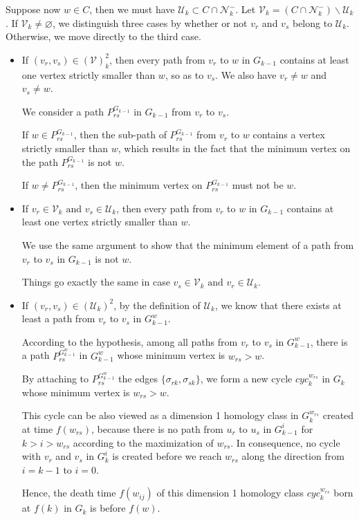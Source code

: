 \documentclass[a4paper,12pt]{article}
\numberwithin{equation}{section}
\begin{document}
	Suppose now $w \in C$, then we must have $\mathcal{U}_k \subset C \cap \mathcal{N}_k^-$. Let $\mathcal{V}_k = (C \cap \mathcal{N}_k^-) \backslash \mathcal{U}_k$. If $\mathcal{V}_k \neq \varnothing$, we distinguish three cases by whether or not $v_r$ and $v_s$ belong to $\mathcal{U}_k$. Otherwise, we move directly to the third case.
	    \begin{itemize}
	    	\item If $(v_r,v_s) \in (\mathcal{V})^2_k$, then every path from $v_r$ to $w$ in $G_{k-1}$ contains at least one vertex strictly smaller than $w$, so as to $v_s$. We also have $v_r \neq w$ and $v_s \neq w$.
	    	
	    	We consider a path $P_{rs}^{G_{k-1}}$ in $G_{k-1}$ from $v_r$ to $v_s$.
	    	
	    	If $w \in P_{rs}^{G_{k-1}}$, then the sub-path of $P_{rs}^{G_{k-1}}$ from $v_r$ to $w$ contains a vertex strictly smaller than $w$, which results in the fact that the minimum vertex on the path $P_{rs}^{G_{k-1}}$ is not $w$.
	    	
		    If $w \neq P_{rs}^{G_{k-1}}$, then the minimum vertex on $P_{rs}^{G_{k-1}}$ must not be $w$.
		    
		    \item If $v_r \in \mathcal{V}_k \text{ and } v_s \in \mathcal{U}_k$, then every path from $v_r$ to $w$ in $G_{k-1}$ contains at least one vertex strictly smaller than $w$.
		    
		    We use the same argument to show that the minimum element of a path from $v_r$ to $v_s$ in $G_{k-1}$ is not $w$.
		    
		    Things go exactly the same in case $v_s \in \mathcal{V}_k \text{ and } v_r \in \mathcal{U}_k$. 

			
			\item If $(v_r, v_s) \in (\mathcal{U}_k)^2$, by the definition of $\mathcal{U}_k$, we know that there exists at least a path from $v_r$ to $v_s$ in $G_{k-1}^w$.
			
			According to the hypothesis, among all paths from $v_r$ to $v_s$ in $G^w_{k-1}$, there is a path $P_{rs}^{G^w_{k-1}}$ in $G_{k-1}^w$ whose minimum vertex is $w_{rs} > w$.
			
			By attaching to $P_{rs}^{G^w_{k-1}}$ the edges $\{\sigma_{rk}, \sigma_{sk} \}$, we form a new cycle $cyc_k^{w_{rs}}$ in $G_{k}$ whose minimum vertex is $w_{rs} > w$. 
			
			This cycle can be also viewed as a dimension 1 homology class in $G_k^{w_{rs}}$ created at time $f(w_{rs})$, because there is no path from $u_r$ to $u_s$ in $G^{i}_{k-1}$ for $k > i > w_{rs}$ according to the maximization of $w_{rs}$. In consequence, no cycle with $v_r$ and $v_s$ in $G^{i}_k$ is created before we reach $w_{rs}$ along the direction from $i = k-1$ to $ i= 0$. 
			
			Hence, the death time $f(w_{ij})$ of this dimension 1 homology class $cyc_k^{w_{rs}}$ born at $f(k)$ in $G_{k}$ is before $f(w)$.     
	    \end{itemize}
	    
\end{document}
